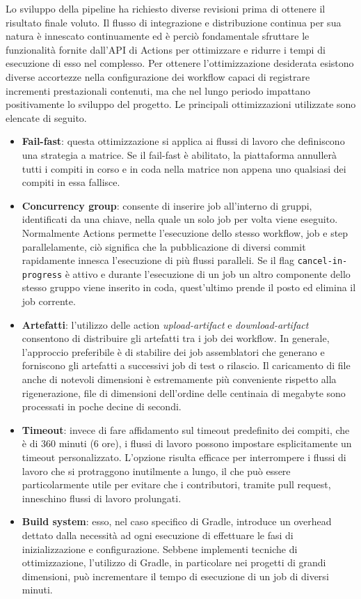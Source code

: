 Lo sviluppo della pipeline ha richiesto diverse revisioni prima di ottenere il risultato finale voluto. Il flusso di integrazione e distribuzione continua per sua natura è innescato continuamente ed è perciò fondamentale sfruttare le funzionalità fornite dall'API di Actions per ottimizzare e ridurre i tempi di esecuzione di esso nel complesso. Per ottenere l'ottimizzazione desiderata esistono diverse accortezze nella configurazione dei workflow capaci di registrare incrementi prestazionali contenuti, ma che nel lungo periodo impattano positivamente lo sviluppo del progetto. Le principali ottimizzazioni utilizzate sono elencate di seguito.
\begin{itemize}
	\item \textbf{Fail-fast}: questa ottimizzazione si applica ai flussi di lavoro che definiscono una strategia a matrice. Se il fail-fast è abilitato, la piattaforma annullerà tutti i compiti in corso e in coda nella matrice non appena uno qualsiasi dei compiti in essa fallisce.
	\item \textbf{Concurrency group}: consente di inserire job all'interno di gruppi, identificati da una chiave, nella quale un solo job per volta viene eseguito. Normalmente Actions permette l'esecuzione dello stesso workflow, job e step parallelamente, ciò significa che la pubblicazione di diversi commit rapidamente  innesca l'esecuzione di più flussi paralleli. Se il flag \texttt{cancel-in-progress} è attivo e durante l'esecuzione di un job un altro componente dello stesso gruppo viene inserito in coda, quest'ultimo prende il posto ed elimina il job corrente.
	\item \textbf{Artefatti}: l'utilizzo delle action \textit{upload-artifact} e \textit{download-artifact} consentono di distribuire gli artefatti tra i job dei workflow. In generale, l'approccio preferibile è di stabilire dei job assemblatori che generano e forniscono gli artefatti a successivi job di test o rilascio. Il caricamento di file anche di notevoli dimensioni è estremamente più conveniente rispetto alla rigenerazione, file di dimensioni dell'ordine delle centinaia di megabyte sono processati in poche decine di secondi.
	\item \textbf{Timeout}: invece di fare affidamento sul timeout predefinito dei compiti, che è di 360 minuti (6 ore), i flussi di lavoro possono impostare esplicitamente un timeout personalizzato. L'opzione risulta efficace per interrompere i flussi di lavoro che si protraggono inutilmente a lungo, il che può essere particolarmente utile per evitare che i contributori, tramite pull request, inneschino flussi di lavoro prolungati.
	\item \textbf{Build system}: esso, nel caso specifico di Gradle, introduce un overhead dettato dalla necessità ad ogni esecuzione di effettuare le fasi di inizializzazione e configurazione. Sebbene implementi tecniche di ottimizzazione, l'utilizzo di Gradle, in particolare nei progetti di grandi dimensioni, può incrementare il tempo di esecuzione di un job di diversi minuti.
\end{itemize}

